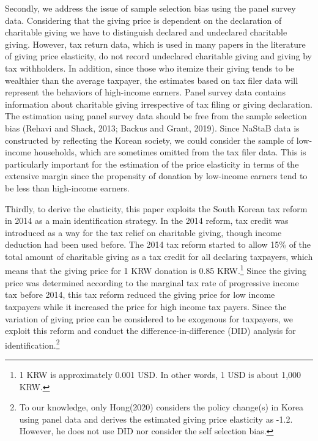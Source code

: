 \documentclass[
  11pt,
  a4paper,
]{article}
\begin{document}
Secondly, we address the issue of sample selection bias using the panel survey data.
Considering that the giving price is dependent on the declaration of charitable giving
we have to distinguish declared and undeclared charitable giving.
However, tax return data,
which is used in many papers in the literature of giving price elasticity,
do not record undeclared charitable giving and giving by tax withholders.
In addition,
since those who itemize their giving tends to be wealthier than the average taxpayer,
the estimates based on tax filer data will represent the behaviors of high-income earners.
Panel survey data contains information about charitable giving
irrespective of tax filing or giving declaration.
The estimation using panel survey data should be free from
the sample selection bias (Rehavi and Shack, 2013; Backus and Grant, 2019).
Since NaStaB data is constructed by reflecting the Korean society,
we could consider the sample of low-income households,
which are sometimes omitted from the tax filer data.
This is particularly important for the estimation of the price elasticity
in terms of the extensive margin
since the propensity of donation by low-income earners
tend to be less than high-income earners.

Thirdly, to derive the elasticity,
this paper exploits the South Korean tax reform in 2014
as a main identification strategy.
In the 2014 reform,
tax credit was introduced as a way for the tax relief on charitable giving,
though income deduction had been used before.
The 2014 tax reform started to allow 15\% of the total amount of charitable giving
as a tax credit for all declaring taxpayers,
which means that the giving price for 1 KRW donation is 0.85 KRW.\footnote{1 KRW is approximately 0.001 USD. In other words, 1 USD is about 1,000 KRW.}
Since the giving price was determined according to the marginal tax rate of
progressive income tax before 2014,
this tax reform reduced the giving price for low income taxpayers
while it increased the price for high income tax payers.
Since the variation of giving price can be considered to be exogenous for taxpayers,
we exploit this reform and conduct the difference-in-difference (DID) analysis
for identification.\footnote{To our knowledge,
  only Hong(2020) considers the policy change(s) in Korea using panel data
  and derives the estimated giving price elasticity as -1.2.
  However, he does not use DID nor consider the self selection bias.}
\end{document}
